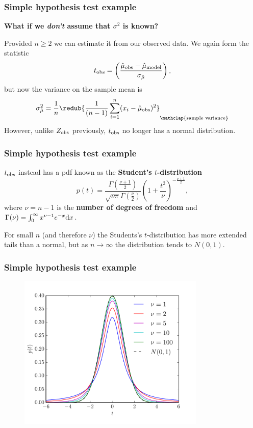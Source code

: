 \begin{frame}

\frametitle{Simple hypothesis test example}
\label{simplehypothesistestexample}

\textbf{What if we \emph{don't} assume that $\sigma^2$ is known?}

Provided $n \ge 2$ we can estimate it from our observed data. We again form the statistic
\[
t_{\rm obs} = \left(\frac{\hat{\mu}_{\rm obs}-\hat{\mu}_{\rm model}}{\sigma_{\hat{\mu}}}\right),
\]
but now the variance on the sample mean is
\[
\sigma^2_{\hat{\mu}} = \frac{1}{n}\redub{\frac{1}{(n-1)}\sum_{i=1}^n (x_i - \hat{\mu}_{\rm obs})^2}_{\mathclap{\text{sample variance}}}
\]
However, unlike $Z_{\rm obs}$ previously, $t_{\rm obs}$ no longer has a normal distribution.

\end{frame}

\begin{frame}

\frametitle{Simple hypothesis test example}
\label{simplehypothesistestexample}

$t_{\rm obs}$ instead has a pdf known as the \textbf{Student's $t$-distribution}
\[
p(t) = \frac{\Gamma\left(\frac{\nu+1}{2}\right)}{\sqrt{\nu\pi}\Gamma\left(\frac{\nu}{2}\right)}\left(1+\frac{t^2}{\nu} \right)^{-\frac{\nu+1}{2}},
\]
where $\nu = n-1$ is the \textbf{number of degrees of freedom} and $\Gamma(\nu) = \int_0^{\infty}x^{\nu-1}e^{-x}{\rm d}x$.

For small $n$ (and therefore $\nu$) the Students's $t$-distribution has more extended tails than a
normal, but as $n \rightarrow \infty$ the distribution tends to $N(0,1)$.

\end{frame}

\begin{frame}

\frametitle{Simple hypothesis test example}
\label{simplehypothesistestexample}

\begin{figure}[htbp]
\centering
\includegraphics[keepaspectratio,width=\textwidth,height=210pt]{figures/studentst.pdf}
\label{studentst}
\end{figure}

\end{frame}

